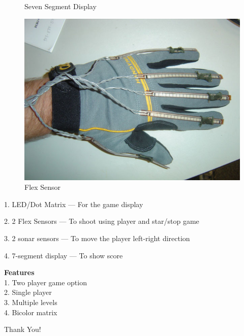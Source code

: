 \documentclass[15pt]{beamer}
\begin{document}
\begin{frame}
\begin{figure}
\begin{minipage}[b]{0.4\textwidth}
    \caption{Seven Segment Display}
  \end{minipage}
    \hfill
  \begin{minipage}[b]{0.4\textwidth}
    \includegraphics[width=.7\textwidth]{flex.jpg}
    \caption{Flex Sensor}
  \end{minipage}
\end{figure}

\end{frame}

\begin{frame}

1. LED/Dot Matrix --- For the game display

2. 2 Flex Sensors --- To shoot using player and star/stop game

3. 2 sonar sensors --- To move the player left-right direction

4. 7-segment display --- To show score

\end{frame}


\begin{frame}%
\textbf{Features}\\
1. Two player game option\\
2. Single player\\
3. Multiple levels\\
4. Bicolor matrix
\end{frame}


\begin{frame}%
\begin{center}
\Huge Thank You!
\end{center}
\end{frame}
\end{document}
